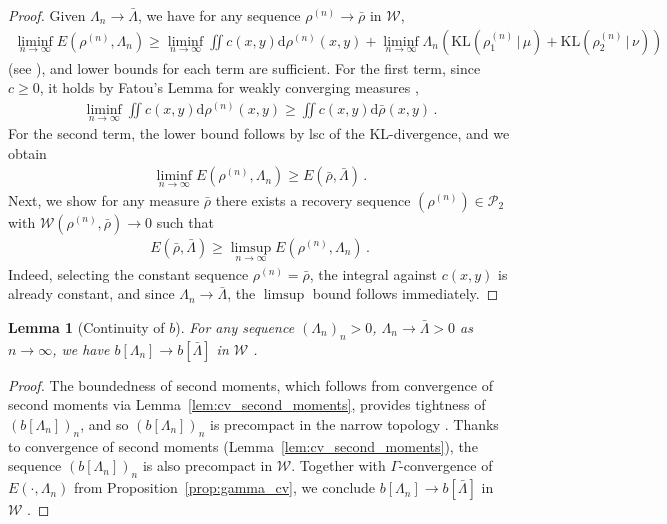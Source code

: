 \documentclass[11pt,a4paper,final]{article}
\newcommand{\KL}[2]{\text{KL}(#1\,|\,#2)}
\def\P{\mathcal P}
\newcommand{\Wass}{\mathscr{W}}
\renewcommand{\d}{\mathrm{d}}
\newcommand{\li}{\liminf_{n\rightarrow\infty}}
\newcommand{\ls}{\limsup_{n\rightarrow\infty}}
\newcommand{\1}{\mathbf{1}}
\theoremstyle{plain}
\newtheorem{lemma}[theorem]{Lemma}
\numberwithin{equation}{section}
\numberwithin{theorem}{section}
\begin{document}
\begin{proof}
 Given $\Lambda_n \rightarrow \bar \Lambda$, we have for any sequence $\rho^{(n)} \to \bar\rho$ in $\Wass$, 
    \begin{align*}
        \li E(\rho^{(n)},\Lambda_n) \geq \li \iint c(x,y)\d\rho^{(n)}(x,y) 
        + \li \Lambda_n(\KL{\rho_1^{(n)}}{\mu} + \KL{\rho_2^{(n)}}{\nu})
    \end{align*}
    (see \cite[Chapter 1, (1.2)]{braides_gamma-convergence_2002}), and lower bounds for each term are sufficient. For the first term, since $c\ge 0$, it holds by Fatou's Lemma for weakly converging measures \cite[Theorem 2.4]{feinberg_fatous_2019},
    \begin{align*}
        \li \iint c(x,y)\d\rho^{(n)}(x,y) \ge
         \iint  c(x,y)\d \bar \rho(x,y) \,.
    \end{align*}
    For the second term, the lower bound follows by lsc of the KL-divergence, and we obtain
    \begin{align*}
    \li E(\rho^{(n)},\Lambda_n) \ge E(\bar\rho,\bar \Lambda)\,.
\end{align*}
    Next, we show for any measure $\bar\rho$ there exists a recovery sequence $(\rho^{(n)})\in\P_2$ with $\Wass(\rho^{(n)},\bar\rho)\to 0$ such that
    \begin{align*}
        E(\bar \rho,\bar \Lambda) \ge \ls E( \rho^{(n)},\Lambda_n)\,.
    \end{align*}
    Indeed, selecting the constant sequence $\rho^{(n)}=\bar \rho$, the integral against $c(x,y)$ is already constant, and since $\Lambda_n\to\bar\Lambda$, the $\limsup$ bound follows immediately.
\end{proof}
\begin{lemma}[Continuity of $b$]\label{lem:continuity_b(rho)}
For any sequence $(\Lambda_n)_n>0$, $\Lambda_n \rightarrow \bar \Lambda>0$  as $n\rightarrow \infty$, we have $b[\Lambda_n]\rightarrow b[\bar \Lambda]$ in $\Wass$ .
\end{lemma}
\begin{proof}
The boundedness of second moments, which follows from convergence of second moments via Lemma~\ref{lem:cv_second_moments}, provides tightness of $(b[\Lambda_n])_n$, and so $(b[\Lambda_n])_n$ is precompact in the narrow topology \cite[Prokorov’s
Theorem 5.1.3]{ags}. Thanks to convergence of second moments (Lemma~\ref{lem:cv_second_moments}), the sequence $(b[\Lambda_n])_n$ is also precompact in $\Wass$. Together with $\Gamma$-convergence of $E(\cdot,\Lambda_n)$ from Proposition~\ref{prop:gamma_cv}, we conclude $b[\Lambda_n]\rightarrow b[\bar \Lambda]$ in $\Wass$ \cite[Theorem 1.21]{braides_gamma-convergence_2002}.
\end{proof}
\end{document}
